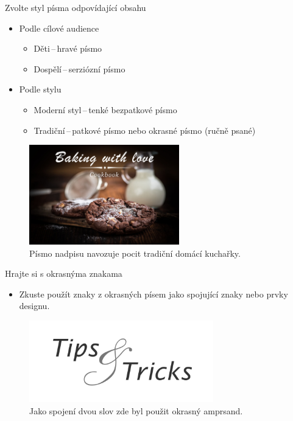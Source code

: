 \documentclass{beamer}
\begin{document}
\begin{frame}{Zvolte styl písma odpovídající obsahu}
	\begin{itemize}
		\item Podle cílové audience
		\begin{itemize}
			\item Děti\,--\,hravé písmo
			\item Dospělí\,--\,serziózní písmo
		\end{itemize}
		\item Podle stylu
		\begin{itemize}
			\item Moderní styl\,--\,tenké bezpatkové písmo 
			\item Tradiční\,--\,patkové písmo nebo okrasné písmo (ručně psané)
		\end{itemize}
	\end{itemize}

	\begin{center}
		\begin{figure}[h]
			\includegraphics[width=65mm]{cookbook.jpg}
			\caption{Písmo nadpisu navozuje pocit tradiční domácí kuchařky.}
		\end{figure}
	\end{center} 
\end{frame}




\begin{frame}{Hrajte si s okrasnýma znakama}   
	\begin{itemize}
		\item Zkuste použít znaky z okrasných písem jako spojující znaky nebo prvky designu.
	\end{itemize}
	\vfill
	\begin{center}
		\begin{figure}[h]
			\includegraphics[width=80mm]{tipsandtricks.png}
			\caption{Jako spojení dvou slov zde byl použit okrasný amprsand.}
		\end{figure}
	\end{center} 
\end{frame}
\end{document}
